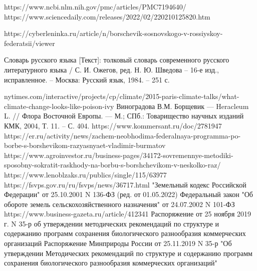 \clearpage
{}



\begin{thebibliography}{99}
	https://www.ncbi.nlm.nih.gov/pmc/articles/PMC7194640/
	https://www.sciencedaily.com/releases/2022/02/220210125820.htm
	
	https://cyberleninka.ru/article/n/borschevik-sosnovskogo-v-rossiyskoy-federatsii/viewer
	
	Словарь русского языка [Текст]: толковый словарь современного русского литературного языка / С. И. Ожегов, ред. Н. Ю. Шведова – 16-е изд., исправленное. – Москва: Русский язык, 1984. – 251 с.
	
	
	
	
	nytimes.com/interactive/projects/cp/climate/2015-paris-climate-talks/what-climate-change-looks-like-poison-ivy
	 Виноградова В.М. Борщевик — Heracleum L. // Флора Восточной Европы. — М.; СПб.: Товарищество научных изданий КМК, 2004, Т. 11. – С. 404.
	 https://www.kommersant.ru/doc/2781947
	 https://er.ru/activity/news/zachem-neobhodima-federalnaya-programma-po-borbe-s-borshevikom-razyasnyaet-vladimir-burmatov
	 https://www.agroinvestor.ru/business-pages/34172-sovremennye-metodiki-sposobny-sokratit-raskhody-na-borbu-s-borshchevikom-v-neskolko-raz/
	 https://www.lenoblzaks.ru/publics/single/115/63977
	 https://fsvps.gov.ru/ru/fsvps/news/36717.html
	 "Земельный кодекс Российской Федерации" от 25.10.2001 N 136-ФЗ (ред. от 01.05.2022)
	Федеральный закон "Об обороте земель сельскохозяйственного назначения" от 24.07.2002 N 101-ФЗ
	 https://www.business-gazeta.ru/article/412341
	 Распоряжение от 25 ноября 2019 г. N 35-р об утверждении методических рекомендаций по структуре и содержанию программ сохранения биологического разнообразия коммерческих организаций	
	 Распоряжение Минприроды России от 25.11.2019 N 35-р "Об утверждении Методических рекомендаций по структуре и содержанию программ сохранения биологического разнообразия коммерческих организаций"
\end{thebibliography}
